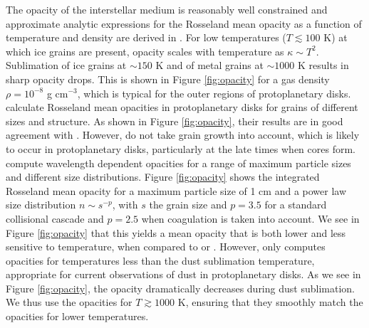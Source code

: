 \documentclass[apj]{emulateapj}
\begin{document}
The opacity of the interstellar medium is reasonably well constrained and approximate analytic expressions for the Rosseland mean opacity as a function of temperature and density are derived in \citet{bell94}. For low temperatures ($T \lesssim 100$ K) at which ice grains are present, opacity scales with temperature as $\kappa \sim T^2$. Sublimation of ice grains at $\sim$$150$ K and of metal grains at $\sim$$1000$ K results in sharp opacity drops. This is shown in Figure \ref{fig:opacity} for a gas density $\rho=10^{-8}$ g cm$^{-3}$, which is typical for the outer regions of protoplanetary disks. \citet{semenov03} calculate Rosseland mean opacities in protoplanetary disks for grains of different sizes and structure. As shown in Figure \ref{fig:opacity}, their results are in good agreement with \citet{bell94}. However, \citet{semenov03} do not take grain growth into account, which is likely to occur in protoplanetary disks, particularly at the late times when cores form. \citet{dalessio01} compute wavelength dependent opacities for a range of maximum particle sizes and different size distributions. Figure \ref{fig:opacity} shows the integrated Rosseland mean opacity for a maximum particle size of 1 cm and a power law size distribution $n \sim s^{-p}$, with $s$ the grain size and $p=3.5$ for a standard collisional cascade and $p=2.5$ when coagulation is taken into account. We see in Figure \ref{fig:opacity} that this yields a mean opacity that is both lower and less sensitive to temperature, when compared to \citet{bell94} or \citet{semenov03}. However, \citet{dalessio01} only computes opacities for temperatures less than the dust sublimation temperature, appropriate for current observations of dust in protoplanetary disks. As we see in Figure \ref{fig:opacity}, the opacity dramatically decreases during dust sublimation. We thus use the \citet{bell94} opacities for $T \gtrsim 1000$ K, ensuring that they smoothly match the \citet{dalessio01} opacities for lower temperatures.
\end{document}
